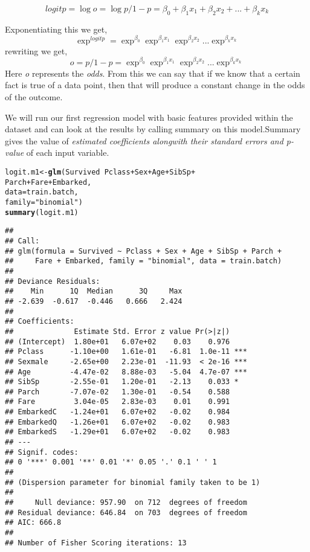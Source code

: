\documentclass[a4paper,10pt]{report}\usepackage[]{graphicx}\usepackage[]{color}
\makeatletter
\newcommand{\hlstr}[1]{\textcolor[rgb]{0.192,0.494,0.8}{#1}}%
\newcommand{\hlopt}[1]{\textcolor[rgb]{0,0,0}{#1}}%
\newcommand{\hlstd}[1]{\textcolor[rgb]{0.345,0.345,0.345}{#1}}%
\newcommand{\hlkwb}[1]{\textcolor[rgb]{0.69,0.353,0.396}{#1}}%
\newcommand{\hlkwc}[1]{\textcolor[rgb]{0.333,0.667,0.333}{#1}}%
\newcommand{\hlkwd}[1]{\textcolor[rgb]{0.737,0.353,0.396}{\textbf{#1}}}%
\newenvironment{kframe}{%
 \def\at@end@of@kframe{}%
 \ifinner\ifhmode%
  \def\at@end@of@kframe{\end{minipage}}%
  \begin{minipage}{\columnwidth}%
 \fi\fi%
 \def\FrameCommand##1{\hskip\@totalleftmargin \hskip-\fboxsep
 \colorbox{shadecolor}{##1}\hskip-\fboxsep
     \hskip-\linewidth \hskip-\@totalleftmargin \hskip\columnwidth}%
 \MakeFramed {\advance\hsize-\width
   \@totalleftmargin\z@ \linewidth\hsize
   \@setminipage}}%
 {\par\unskip\endMakeFramed%
 \at@end@of@kframe}
\newenvironment{knitrout}{}{} %
\makeatother
\begin{document}
$$
logit{p} = \log{o} = \log{p/1-p} = \beta_{0} + \beta_{1}x_{1} +\beta_{2}x_{2} + ...+\beta_{k}x_{k}
$$

Exponentiating this we get,
$$ \exp^{logit{p}} = \exp^{\beta_{0}} \exp^{\beta_{1}x_{1}} \exp^{\beta_{2}x_{2}}... \exp^{\beta_{k}x_{k}} $$
rewriting we get,
$$ o = p/1-p = \exp^{\beta_{0}} \exp^{\beta_{1}x_{1}} \exp^{\beta_{2}x_{2}}... \exp^{\beta_{k}x_{k}} $$
Here \emph{o} represents the \emph{odds}. From this we can say that if we know that a certain fact is true of a data point, then that will produce a constant change in the odds of the outcome.

We will run our first regression model with basic features provided within the dataset and can look at the results by calling summary on this model.Summary gives the value of \emph{estimated coefficients alongwith their standard errors and p-value} of each input variable. 

\begin{knitrout}
\color{fgcolor}\begin{kframe}
\begin{alltt}
\hlstd{logit.m1} \hlkwb{<-} \hlkwd{glm}\hlstd{(Survived} \hlopt{~} \hlstd{Pclass} \hlopt{+} \hlstd{Sex} \hlopt{+} \hlstd{Age} \hlopt{+} \hlstd{SibSp} \hlopt{+}
                  \hlstd{Parch} \hlopt{+} \hlstd{Fare} \hlopt{+} \hlstd{Embarked,}
                \hlkwc{data} \hlstd{= train.batch,}
                \hlkwc{family}\hlstd{=}\hlstr{"binomial"}\hlstd{)}
\hlkwd{summary}\hlstd{(logit.m1)}
\end{alltt}
\begin{verbatim}
## 
## Call:
## glm(formula = Survived ~ Pclass + Sex + Age + SibSp + Parch + 
##     Fare + Embarked, family = "binomial", data = train.batch)
## 
## Deviance Residuals: 
##    Min      1Q  Median      3Q     Max  
## -2.639  -0.617  -0.446   0.666   2.424  
## 
## Coefficients:
##              Estimate Std. Error z value Pr(>|z|)    
## (Intercept)  1.80e+01   6.07e+02    0.03    0.976    
## Pclass      -1.10e+00   1.61e-01   -6.81  1.0e-11 ***
## Sexmale     -2.65e+00   2.23e-01  -11.93  < 2e-16 ***
## Age         -4.47e-02   8.88e-03   -5.04  4.7e-07 ***
## SibSp       -2.55e-01   1.20e-01   -2.13    0.033 *  
## Parch       -7.07e-02   1.30e-01   -0.54    0.588    
## Fare         3.04e-05   2.83e-03    0.01    0.991    
## EmbarkedC   -1.24e+01   6.07e+02   -0.02    0.984    
## EmbarkedQ   -1.26e+01   6.07e+02   -0.02    0.983    
## EmbarkedS   -1.29e+01   6.07e+02   -0.02    0.983    
## ---
## Signif. codes:  
## 0 '***' 0.001 '**' 0.01 '*' 0.05 '.' 0.1 ' ' 1
## 
## (Dispersion parameter for binomial family taken to be 1)
## 
##     Null deviance: 957.90  on 712  degrees of freedom
## Residual deviance: 646.84  on 703  degrees of freedom
## AIC: 666.8
## 
## Number of Fisher Scoring iterations: 13
\end{verbatim}
\end{kframe}
\end{knitrout}
\end{document}
